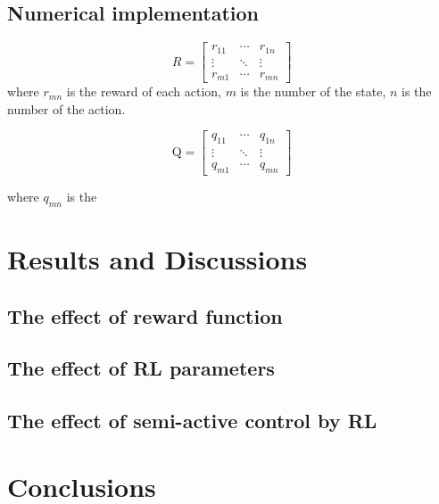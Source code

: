 \subsection{Numerical implementation}
\begin{equation}
R=\left[\begin{array}{ccc}
{r_{11}} & {\cdots} & {r_{1 n}} \\
{\vdots} & {\ddots} & {\vdots} \\
{r_{m 1}} & {\cdots} & {r_{m n}}
\end{array}\right]
\end{equation}
where $r_{mn}$ is the reward of each action, $m$ is the number of the state, $n$ is the number of the action. 

\begin{equation}
\mathrm{Q}=\left[\begin{array}{ccc}
{q_{11}} & {\cdots} & {q_{1 n}} \\
{\vdots} & {\ddots} & {\vdots} \\
{q_{m 1}} & {\cdots} & {q_{m n}}
\end{array}\right]
\end{equation}

where $q_{mn}$ is the 



\section{Results and Discussions}
\subsection{The effect of reward function}
\subsection{The effect of RL parameters}
\subsection{The effect of semi-active control by RL}
\section{Conclusions}





%

%
%




